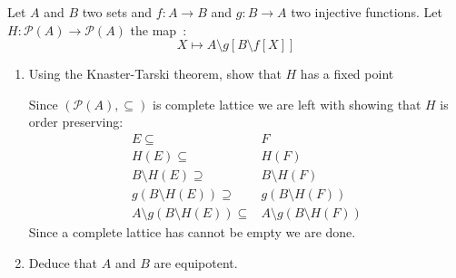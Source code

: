 \documentclass[a4paper,11pt]{exam}
\begin{document}
\begin{questions}
		Let $A$ and $B$ two sets and $f:A \to B$ and $g: B \to A$ two injective functions.
		Let $H:\mathcal{P}(A)\to  \mathcal{P}(A)$ the map~:
		$$
		X \mapsto A \setminus g[B \setminus f[X]]
		$$
		\begin{enumerate}
			\item Using the Knaster-Tarski theorem, show that $ H $ has a fixed point
			
			\begin{solution}
				Since $(\mathcal{P}(A),\subseteq)$ is complete lattice we are left with showing that $H$ is order preserving: 
				\begin{align*}
				E \subseteq&  F\\
				H(E) \subseteq& H(F)\\
				B\setminus H(E) \supseteq&  B\setminus H(F)\\
				g\left(B\setminus H(E)\right)  \supseteq&  g\left(B\setminus H(F)\right)\\
				A\setminus g\left(B\setminus H(E)\right) \subseteq& A\setminus g\left(B\setminus H(F)\right)
				\end{align*}
				Since a complete lattice has cannot be empty we are done.
				
			\end{solution}
			
			\item Deduce that  $A$ and $B$ are equipotent.
			

\end{enumerate}
\end{questions}
\end{document}
